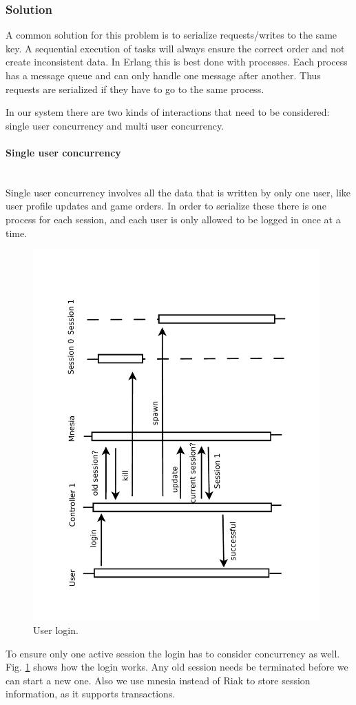 \documentclass[11pt,a4paper]{report}
\newcommand{\subsubsubsection}[1]{\paragraph{#1}\mbox{}\\}
\begin{document}
\subsubsection{Solution}
A common solution for this problem is to serialize requests/writes to the same
key.
A sequential execution of tasks will always ensure the correct order and not
create inconsistent data.
In Erlang this is best done with processes.
Each process has a message queue and can only handle one message after another.
Thus requests are serialized if they have to go to the same process.

In our system there are two kinds of interactions that need to be considered:
single user concurrency and multi user concurrency.

\subsubsubsection{Single user concurrency}
Single user concurrency involves all the data that is written by only one user,
like user profile updates and game orders.
In order to serialize these there is one process for each session,
and each user is only allowed to be logged in once at a time.
\begin{figure}[htbp!]
  \centering
 \includegraphics[width=11cm, angle=-90]{./graphics/Concurrency_-_Login.pdf}
 \vspace{-1cm}
 \caption{User login.}
 \label{fig:concurrency:login}
\end{figure}
To ensure only one active session the login has to consider concurrency as well.
Fig. \ref{fig:concurrency:login} shows how the login works.
Any old session needs be terminated before we can start a new one.
Also we use mnesia instead of Riak to store session information,
as it supports transactions.
\end{document}
